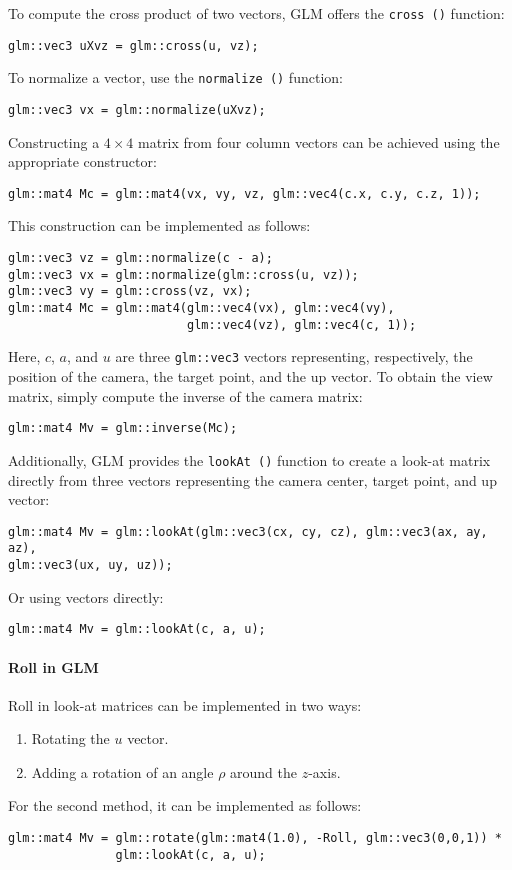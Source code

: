 To compute the cross product of two vectors, GLM offers the \texttt{cross ()} function:
\begin{verbatim}
glm::vec3 uXvz = glm::cross(u, vz);
\end{verbatim}
To normalize a vector, use the \texttt{normalize ()} function:
\begin{verbatim}
glm::vec3 vx = glm::normalize(uXvz);
\end{verbatim}
Constructing a $4 \times 4$ matrix from four column vectors can be achieved using the appropriate constructor:
\begin{verbatim}
glm::mat4 Mc = glm::mat4(vx, vy, vz, glm::vec4(c.x, c.y, c.z, 1));
\end{verbatim}
This construction can be implemented as follows:
\begin{verbatim}
glm::vec3 vz = glm::normalize(c - a);
glm::vec3 vx = glm::normalize(glm::cross(u, vz));
glm::vec3 vy = glm::cross(vz, vx);
glm::mat4 Mc = glm::mat4(glm::vec4(vx), glm::vec4(vy), 
                         glm::vec4(vz), glm::vec4(c, 1));
\end{verbatim}
Here, $c$, $a$, and $u$ are three \texttt{glm::vec3} vectors representing, respectively, the position of the camera, the target point, and the up vector. 
To obtain the view matrix, simply compute the inverse of the camera matrix:
\begin{verbatim}
glm::mat4 Mv = glm::inverse(Mc);
\end{verbatim}

Additionally, GLM provides the \texttt{lookAt ()} function to create a look-at matrix directly from three vectors representing the camera center, target point, and up vector:
\begin{verbatim}
glm::mat4 Mv = glm::lookAt(glm::vec3(cx, cy, cz), glm::vec3(ax, ay, az),
glm::vec3(ux, uy, uz));
\end{verbatim}
Or using vectors directly:
\begin{verbatim}
glm::mat4 Mv = glm::lookAt(c, a, u);
\end{verbatim}

\paragraph*{Roll in GLM}
Roll in look-at matrices can be implemented in two ways:
\begin{enumerate}
    \item Rotating the $u$ vector.
    \item Adding a rotation of an angle $\rho$ around the $z$-axis.
\end{enumerate}
For the second method, it can be implemented as follows:
\begin{verbatim}
glm::mat4 Mv = glm::rotate(glm::mat4(1.0), -Roll, glm::vec3(0,0,1)) *
               glm::lookAt(c, a, u);
\end{verbatim}

